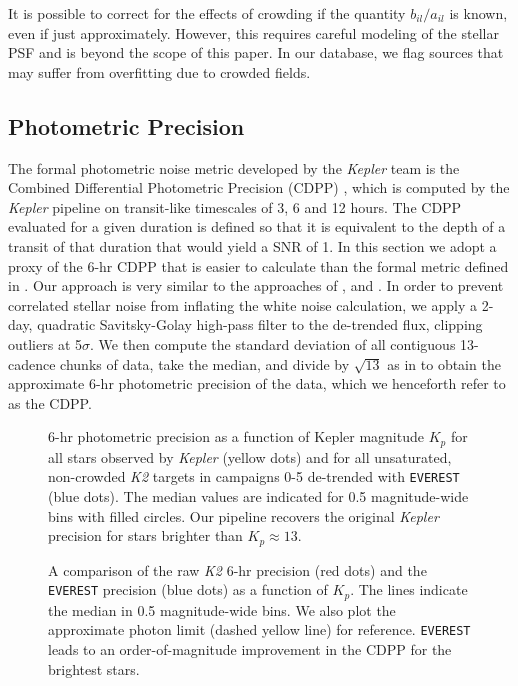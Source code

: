 \documentclass[]{emulateapj}
\begin{document}
It is possible to correct for the effects of crowding if the quantity $b_{il}/a_{il}$
is known, even if just approximately. However, this requires careful modeling of the
stellar PSF and is beyond the scope of this paper. In our database, we flag sources
that may suffer from overfitting due to crowded fields.

\subsection{Photometric Precision}
\label{sec:precision}
The formal photometric noise metric developed by the \emph{Kepler} team is the
Combined Differential Photometric Precision (CDPP) \citep{CHR12}, which is computed
by the \emph{Kepler} pipeline on transit-like timescales of 3, 6 and 12 hours.
The CDPP evaluated for a given duration is defined so that it is equivalent to the 
depth of a transit of that duration that would yield a SNR of 1. In this section we adopt a proxy 
of the 6-hr CDPP that is easier to calculate than
the formal metric defined in \cite{CHR12}. Our approach is very similar to the approaches
of \cite{GIL11}, \cite{VJ14} and \cite{AIG16}. In order to prevent correlated stellar
noise from inflating the white noise calculation, we apply a 2-day, quadratic Savitsky-Golay 
\citep{SG64} high-pass filter to the de-trended flux, clipping
outliers at 5$\sigma$. We then compute the standard deviation of all contiguous 13-cadence
chunks of data, take the median, and divide by $\sqrt{13}$ as in \cite{VJ14} to obtain
the approximate 6-hr photometric precision of the data, which we henceforth refer to
as the CDPP.

\label{sec:precision}
\begin{figure}[h]
  \begin{center}
       \caption{6-hr photometric precision as a function of Kepler magnitude $K_p$
                for all stars observed by \emph{Kepler} 
                (yellow dots) and for all unsaturated, non-crowded \emph{K2} targets
                in campaigns 0-5 de-trended with \texttt{EVEREST}
                (blue dots). The median values are indicated
                for 0.5 magnitude-wide bins with filled circles.
                Our pipeline recovers the original \emph{Kepler} precision for stars
                brighter than $K_p \approx 13$.}
     \label{fig:precision1}
  \end{center}
\end{figure}
\begin{figure}[h]
  \begin{center}
       \caption{A comparison of the raw \emph{K2} 6-hr precision (red dots) and the \texttt{EVEREST} 
       precision (blue dots) as a function of $K_p$. The lines
       indicate the median in 0.5 magnitude-wide bins. We also plot the approximate photon
       limit (dashed yellow line) for reference. \texttt{EVEREST} leads to an order-of-magnitude
       improvement in the CDPP for the brightest stars.}
     \label{fig:precision2}
  \end{center}
\end{figure}
\end{document}
